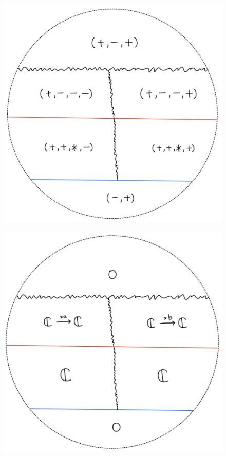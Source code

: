 \begin{figure}[H]
    \centering
    \includegraphics[scale = 0.45]{diagrams/lemma2/38.png} 
    \caption{}
    \label{fig:your-label}
\end{figure}
\begin{figure}[H]
    \centering
    \includegraphics[scale = 0.45]{diagrams/lemma2/39.png} 
    \caption{}
    \label{fig:your-label}
\end{figure}
